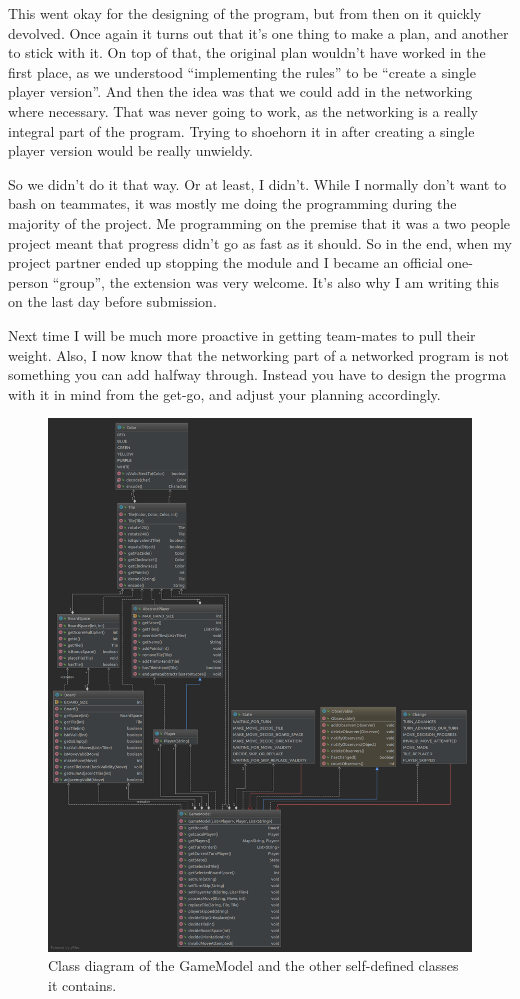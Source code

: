 \documentclass[12pt, letterpaper]{article}
\begin{document}
    This went okay for the designing of the program, but from then on it quickly devolved.
    Once again it turns out that it's one thing to make a plan, and another to stick with it.
    On top of that, the original plan wouldn't have worked in the first place, as we understood
    ``implementing the rules'' to be ``create a single player version''.
    And then the idea was that we could add in the networking where necessary.
    That was never going to work, as the networking is a really integral part of the program.
    Trying to shoehorn it in after creating a single player version would be really unwieldy.

    So we didn't do it that way.
    Or at least, I didn't.
    While I normally don't want to bash on teammates, it was mostly me doing the programming during the majority of the
    project.
    Me programming on the premise that it was a two people project meant that progress didn't go as fast as it should.
    So in the end, when my project partner ended up stopping the module and I became an official one-person ``group'',
    the extension was very welcome.
    It's also why I am writing this on the last day before submission.

    Next time I will be much more proactive in getting team-mates to pull their weight.
    Also, I now know that the networking part of a networked program is not something you can add halfway through.
    Instead you have to design the progrma with it in mind from the get-go, and adjust your planning accordingly.

    \begin{figure}[t]
        \begin{center}
            \includegraphics[width=\textwidth]{GameModel.png}
            \caption{Class diagram of the GameModel and the other self-defined classes it contains.}
            \label{fig:modelDiagram}
        \end{center}
    \end{figure}
\end{document}
